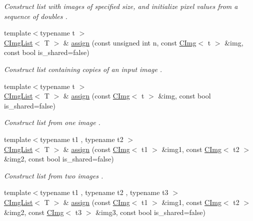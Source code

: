 \begin{DoxyCompactItemize}
\begin{DoxyCompactList}\small\item\em Construct list with images of specified size, and initialize pixel values from a sequence of doubles . \end{DoxyCompactList}\item 
{\footnotesize template$<$typename t $>$ }\\\hyperlink{structcimg__library__suffixed_1_1CImgList}{C\+Img\+List}$<$ T $>$ \& \hyperlink{structcimg__library__suffixed_1_1CImgList_a4ea4b85cfebafa021b27e30ef8743d6f}{assign} (const unsigned int n, const \hyperlink{structcimg__library__suffixed_1_1CImg}{C\+Img}$<$ t $>$ \&img, const bool is\+\_\+shared=false)
\begin{DoxyCompactList}\small\item\em Construct list containing copies of an input image . \end{DoxyCompactList}\item 
{\footnotesize template$<$typename t $>$ }\\\hyperlink{structcimg__library__suffixed_1_1CImgList}{C\+Img\+List}$<$ T $>$ \& \hyperlink{structcimg__library__suffixed_1_1CImgList_a5db2c1a3ac413e7dadb7ee4cb9a555b3}{assign} (const \hyperlink{structcimg__library__suffixed_1_1CImg}{C\+Img}$<$ t $>$ \&img, const bool is\+\_\+shared=false)
\begin{DoxyCompactList}\small\item\em Construct list from one image . \end{DoxyCompactList}\item 
{\footnotesize template$<$typename t1 , typename t2 $>$ }\\\hyperlink{structcimg__library__suffixed_1_1CImgList}{C\+Img\+List}$<$ T $>$ \& \hyperlink{structcimg__library__suffixed_1_1CImgList_aa8c46892c6e8664f83b3090c4f6525d6}{assign} (const \hyperlink{structcimg__library__suffixed_1_1CImg}{C\+Img}$<$ t1 $>$ \&img1, const \hyperlink{structcimg__library__suffixed_1_1CImg}{C\+Img}$<$ t2 $>$ \&img2, const bool is\+\_\+shared=false)
\begin{DoxyCompactList}\small\item\em Construct list from two images . \end{DoxyCompactList}\item 
{\footnotesize template$<$typename t1 , typename t2 , typename t3 $>$ }\\\hyperlink{structcimg__library__suffixed_1_1CImgList}{C\+Img\+List}$<$ T $>$ \& \hyperlink{structcimg__library__suffixed_1_1CImgList_ac6f8bbbcd34f7987744bffcf53f91777}{assign} (const \hyperlink{structcimg__library__suffixed_1_1CImg}{C\+Img}$<$ t1 $>$ \&img1, const \hyperlink{structcimg__library__suffixed_1_1CImg}{C\+Img}$<$ t2 $>$ \&img2, const \hyperlink{structcimg__library__suffixed_1_1CImg}{C\+Img}$<$ t3 $>$ \&img3, const bool is\+\_\+shared=false)

\end{DoxyCompactItemize}
